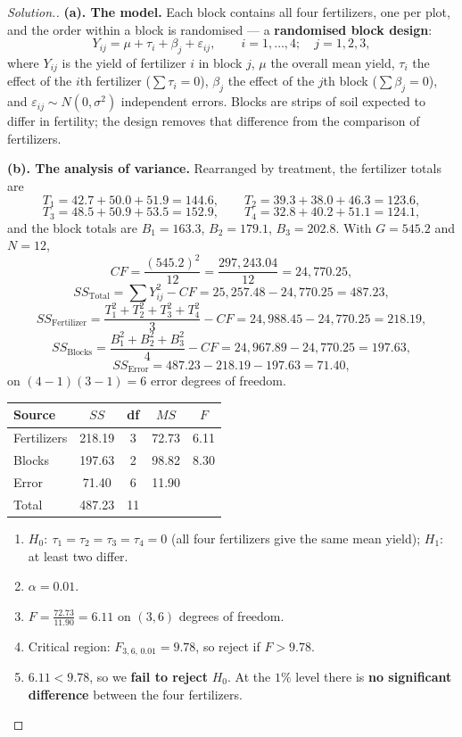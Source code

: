 \documentclass[11pt,a4paper]{article}
\theoremstyle{definition}
\newenvironment{solution}
  {\renewcommand{\qedsymbol}{}\begin{proof}[\textit{Solution}.]}
  {\end{proof}}
\begin{document}
\begin{solution}
\textbf{(a). The model.} Each block contains all four fertilizers, one per plot, and the
order within a block is randomised --- a \textbf{randomised block design}:
\[Y_{ij}=\mu+\tau_i+\beta_j+\varepsilon_{ij},\qquad i=1,\ldots,4;\quad j=1,2,3,\]
where $Y_{ij}$ is the yield of fertilizer $i$ in block $j$, $\mu$ the overall mean yield,
$\tau_i$ the effect of the $i$th fertilizer ($\sum\tau_i=0$), $\beta_j$ the effect of the
$j$th block ($\sum\beta_j=0$), and $\varepsilon_{ij}\sim N(0,\sigma^2)$ independent errors.
Blocks are strips of soil expected to differ in fertility; the design removes that
difference from the comparison of fertilizers.

\textbf{(b). The analysis of variance.} Rearranged by treatment, the fertilizer totals are
\[T_1=42.7+50.0+51.9=144.6,\qquad T_2=39.3+38.0+46.3=123.6,\]
\[T_3=48.5+50.9+53.5=152.9,\qquad T_4=32.8+40.2+51.1=124.1,\]
and the block totals are $B_1=163.3$, $B_2=179.1$, $B_3=202.8$. With $G=545.2$ and $N=12$,
\[CF=\frac{(545.2)^2}{12}=\frac{297{,}243.04}{12}=24{,}770.25,\]
\[SS_{\text{Total}}=\sum Y_{ij}^2-CF=25{,}257.48-24{,}770.25=487.23,\]
\[SS_{\text{Fertilizer}}=\frac{T_1^2+T_2^2+T_3^2+T_4^2}{3}-CF=24{,}988.45-24{,}770.25=218.19,\]
\[SS_{\text{Blocks}}=\frac{B_1^2+B_2^2+B_3^2}{4}-CF=24{,}967.89-24{,}770.25=197.63,\]
\[SS_{\text{Error}}=487.23-218.19-197.63=71.40,\]
on $(4-1)(3-1)=6$ error degrees of freedom.
\begin{table}[H]
\centering
\begin{tabular}{lcccc}
Source & $SS$ & df & $MS$ & $F$\\
\hline
Fertilizers & 218.19 & 3 & 72.73 & 6.11\\
Blocks & 197.63 & 2 & 98.82 & 8.30\\
Error & 71.40 & 6 & 11.90 & \\
\hline
Total & 487.23 & 11 & & \\
\end{tabular}
\end{table}
\begin{enumerate}
\item $H_0:\ \tau_1=\tau_2=\tau_3=\tau_4=0$ (all four fertilizers give the same mean yield);
$H_1:$ at least two differ.
\item $\alpha=0.01$.
\item $F=\frac{72.73}{11.90}=6.11$ on $(3,6)$ degrees of freedom.
\item Critical region: $F_{3,6,\,0.01}=9.78$, so reject if $F>9.78$.
\item $6.11<9.78$, so we \textbf{fail to reject} $H_0$. At the $1\%$ level there is
\textbf{no significant difference} between the four fertilizers.
\end{enumerate}


\end{solution}
\end{document}
